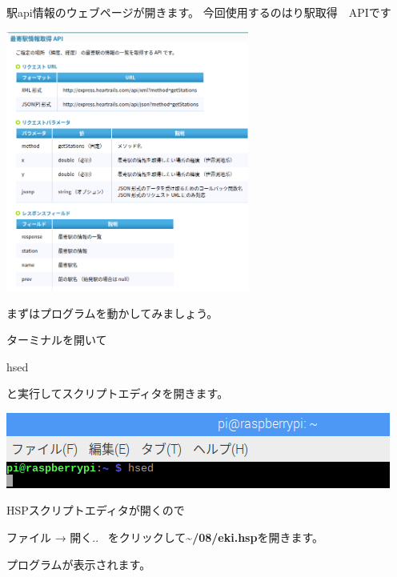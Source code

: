 駅api情報のウェブページが開きます。
今回使用するのはり駅取得　APIです



\begin{center}
\includegraphics[width=0.6\textwidth]{./text08-img/textbook-img049.png}

\end{center}




\clearpage
まずはプログラムを動かしてみましょう。

ターミナルを開いて

hsed

と実行してスクリプトエディタを開きます。



\begin{center}
\includegraphics[width=\textwidth]{./text08-img/textbook-img013.png}

\end{center}
HSPスクリプトエディタが開くので

ファイル → 開く..
\ をクリックして\textbf{{\textasciitilde}/08/eki.hsp}を開きます。

プログラムが表示されます。



